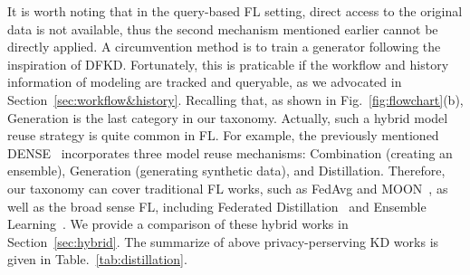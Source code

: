 It is worth noting that in the query-based FL setting, direct access to the original data is not available, thus the second mechanism mentioned earlier cannot be directly applied.
A circumvention method is to train a generator following the inspiration of DFKD. 
Fortunately, this is praticable if the workflow and history information of modeling are tracked and queryable, as we advocated in Section~\ref{sec:workflow&history}.
Recalling that, as shown in Fig.~\ref{fig:flowchart}(b), Generation is the last category in our taxonomy.
Actually, such a hybrid model reuse strategy is quite common in FL. 
For example, the previously mentioned DENSE~\cite{zhang2022dense} incorporates three model reuse mechanisms: Combination (creating an ensemble), Generation (generating synthetic data), and Distillation.
Therefore, our taxonomy can cover traditional FL works, such as FedAvg and MOON~\cite{li2021model}, as well as the broad sense FL, including Federated Distillation~\cite{jeong2018communication, jin2023feddyn} and Ensemble Learning~\cite{shi2023fed, wang2023data}.
We provide a comparison of these hybrid works in Section~\ref{sec:hybrid}. 
The summarize of above privacy-perserving KD works is given in Table.~\ref{tab:distillation}.



